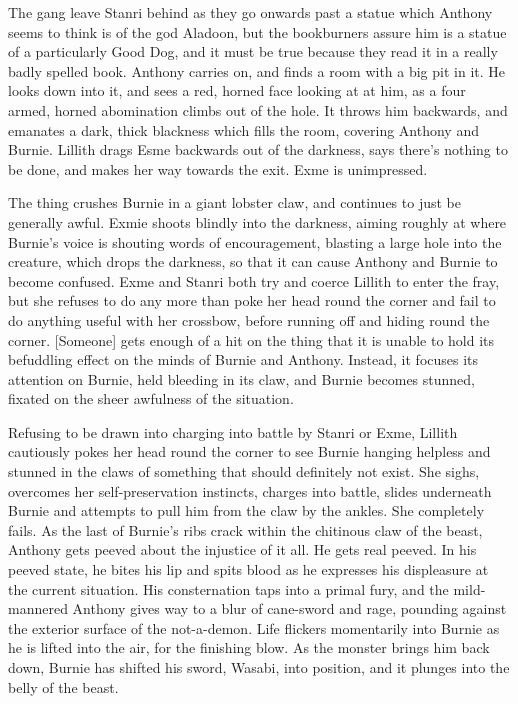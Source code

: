The gang leave Stanri behind as they go onwards past a statue which Anthony seems to think is of the god Aladoon, but the bookburners assure him is a statue of a particularly Good Dog, and it must be true because they read it in a really badly spelled book. Anthony carries on, and finds a room with a big pit in it. He looks down into it, and sees a red, horned face looking at at him, as a four armed, horned abomination climbs out of the hole. It throws him backwards, and emanates a dark, thick blackness which fills the room, covering Anthony and Burnie. Lillith drags Esme backwards out of the darkness, says there’s nothing to be done, and makes her way towards the exit. Exme is unimpressed.\medskip

The thing crushes Burnie in a giant lobster claw, and continues to just be generally awful. Exmie shoots blindly into the darkness, aiming roughly at where Burnie’s voice is shouting words of encouragement, blasting a large hole into the creature, which drops the darkness, so that it can cause Anthony and Burnie to become confused. Exme and Stanri both try and coerce Lillith to enter the fray, but she refuses to do any more than poke her head round the corner and fail to do anything useful with her crossbow, before running off and hiding round the corner. [Someone] gets enough of a hit on the thing that it is unable to hold its befuddling effect on the minds of Burnie and Anthony. Instead, it focuses its attention on Burnie, held bleeding in its claw, and Burnie becomes stunned, fixated on the sheer awfulness of the situation.\medskip

Refusing to be drawn into charging into battle by Stanri or Exme, Lillith cautiously pokes her head round the corner to see Burnie hanging helpless and stunned in the claws of something that should definitely not exist. She sighs, overcomes her self-preservation instincts, charges into battle, slides underneath Burnie and attempts to pull him from the claw by the ankles. She completely fails. As the last of Burnie’s ribs crack within the chitinous claw of the beast, Anthony gets peeved about the injustice of it all. He gets real peeved. In his peeved state, he bites his lip and spits blood as he expresses his displeasure at the current situation. His consternation taps into a primal fury, and the mild-mannered Anthony gives way to a blur of cane-sword and rage, pounding against the exterior surface of the not-a-demon. Life flickers momentarily into Burnie as he is lifted into the air, for the finishing blow. As the monster brings him back down, Burnie has shifted his sword, Wasabi, into position, and it plunges into the belly of the beast.\medskip

